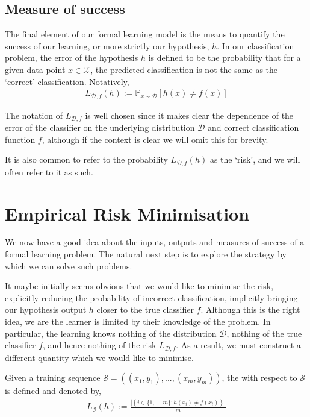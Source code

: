 \subsection{Measure of success}
The final element of our formal learning model is the means to quantify the success of our learning, or more strictly our hypothesis, $ h $. In our classification problem, the error of the hypothesis $ h $ is defined to be the probability that for a given data point $ x \in \mathcal{X} $, the predicted classification is not the same as the `correct' classification. Notatively,
\begin{align*}
	L_{\mathcal{D}, f}( h ) := \mathbb{P}_{x \sim \mathcal{D}}\left[ h ( x ) \neq f ( x ) \right]
\end{align*}

\begin{remark}
	The notation of $ L_{\mathcal{D}, f} $ is well chosen since it makes clear the dependence of the error of the classifier on the underlying distribution $ \mathcal{D} $ and correct classification function $ f $, although if the context is clear we will omit this for brevity.

	It is also common to refer to the probability $ L_{\mathcal{D}, f}( h ) $ as the `risk', and we will often refer to it as such.
\end{remark}

\section{Empirical Risk Minimisation \intermediate}
We now have a good idea about the inputs, outputs and measures of success of a formal learning problem. The natural next step is to explore the strategy by which we can solve such problems.

It maybe initially seems obvious that we would like to minimise the risk, explicitly reducing the probability of incorrect classification, implicitly bringing our hypothesis output $ h $ closer to the true classifier $ f $. Although this is the right idea, we are the learner is limited by their knowledge of the problem. In particular, the learning knows nothing of the distribution $ \mathcal{D} $, nothing of the true classifier $ f $, and hence nothing of the risk $ L_{\mathcal{D}, f} $. As a result, we must construct a different quantity which we would like to minimise.

\begin{definition}
	Given a training sequence $ \mathcal{S} = ( ( x_{1}, y_{1} ), ..., ( x_{m}, y_{m} ) ) $, the  with respect to $ \mathcal{S} $ is defined and denoted by,
	\begin{align*}
		L_{\mathcal{S}}( h ) := \frac{|\left\{ i \in \{ 1,...,m \}: h ( x_{i} ) \neq f ( x_{i} ) \right\}|}{m}
	\end{align*}
\end{definition}

